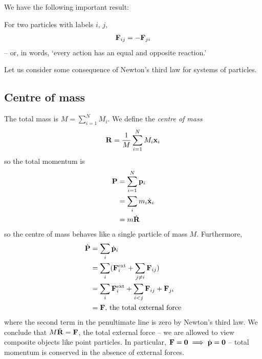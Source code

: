 \documentclass{../template/note}
\begin{document}
    We have the following important result:
    \begin{theorem}
        For two particles with labels \(i\), \(j\),
        \begin{align*}
            \V F_{ij} = -\V F_{ji}
        \end{align*}
        -- or, in words, `every action has an equal and opposite reaction.'
    \end{theorem}

    
    Let us consider some consequence of Newton's third law for systems of particles.

    \subsection{Centre of mass}

    The total mass is \(M = \sum_{i=1}^N M_i\). We define the \emph{centre of mass}
    \begin{align*}
        \V R = \frac 1 M \sum_{i=1}^N M_i \V x_i
    \end{align*}
    so the total momentum is
    \begin{align*}
        \V P &= \sum_{i=1}^N \V p _i \\
        &= \sum_i m_i \dot{\V x}_i \\
        &= m \dot{\V R}
    \end{align*}
    so the centre of mass behaves like a single particle of mass \(M\). Furthermore,
    \begin{align*}
        \dot{\V P} &= \sum_i \dot{\V p}_i \\
        &= \sum_i (\V F_i^\text{ext} + \sum_{j \neq i}\V F_{ij}) \\
        &= \sum_i \V F_i^\text{ext} + \sum_{i < j}\V F_{ij} + \V F_{ji} \\
        &= \V F,\, \text{the total external force}
    \end{align*}
    where the second term in the penultimate line is zero by Newton's third law. We conclude that \(M \ddot{\V R} = \V F\), the total external force -- we are allowed to view composite objects like point particles. In particular, \(\V F = \V 0 \implies \dot{\V p} = \V 0\) -- total momentum is conserved in the absence of external forces.
\end{document}
